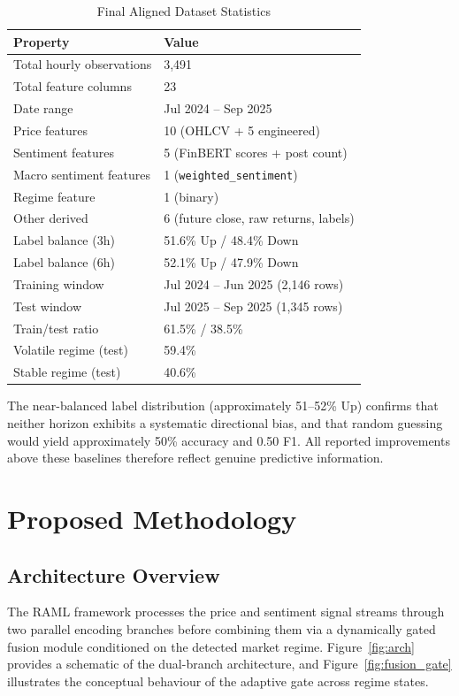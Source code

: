 \documentclass[journal]{IEEEtran}
\newcommand{\raml}{\textsc{RAML}}
\begin{document}
\begin{table}[!t]
  \centering
  \caption{Final Aligned Dataset Statistics}
  \label{tab:dataset}
  \renewcommand{\arraystretch}{1.15}
  \begin{tabular}{ll}
    \toprule
    \textbf{Property} & \textbf{Value} \\
    \midrule
    Total hourly observations & 3,491 \\
    Total feature columns & 23 \\
    Date range & Jul 2024 -- Sep 2025 \\
    Price features & 10 (OHLCV + 5 engineered) \\
    Sentiment features & 5 (FinBERT scores + post count) \\
    Macro sentiment features & 1 (\texttt{weighted\_sentiment}) \\
    Regime feature & 1 (binary) \\
    Other derived & 6 (future close, raw returns, labels) \\
    \midrule
    Label balance (3h) & 51.6\% Up / 48.4\% Down \\
    Label balance (6h) & 52.1\% Up / 47.9\% Down \\
    \midrule
    Training window & Jul 2024 -- Jun 2025 (2,146 rows) \\
    Test window & Jul 2025 -- Sep 2025 (1,345 rows) \\
    Train/test ratio & 61.5\% / 38.5\% \\
    Volatile regime (test) & 59.4\% \\
    Stable regime (test) & 40.6\% \\
    \bottomrule
  \end{tabular}
\end{table}

The near-balanced label distribution (approximately 51--52\% Up) confirms that
neither horizon exhibits a systematic directional bias, and that random guessing
would yield approximately 50\% accuracy and 0.50 F1. All reported improvements
above these baselines therefore reflect genuine predictive information.

\section{Proposed Methodology}
\label{sec:method}

\subsection{Architecture Overview}
The \raml{} framework processes the price and sentiment signal streams through
two parallel encoding branches before combining them via a dynamically gated
fusion module conditioned on the detected market regime.
Figure~\ref{fig:arch} provides a schematic of the dual-branch architecture,
and Figure~\ref{fig:fusion_gate} illustrates the conceptual behaviour of the
adaptive gate across regime states.
\end{document}
